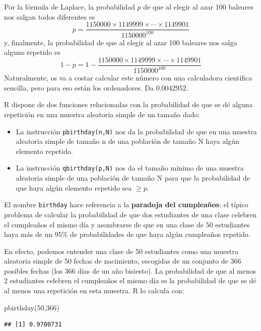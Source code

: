 \documentclass[
]{book}
\newenvironment{Shaded}{\begin{snugshade}}{\end{snugshade}}
\newcommand{\DecValTok}[1]{\textcolor[rgb]{0.00,0.00,0.81}{#1}}
\newcommand{\FunctionTok}[1]{\textcolor[rgb]{0.00,0.00,0.00}{#1}}
\newcommand{\NormalTok}[1]{#1}
\theoremstyle{definition}
\theoremstyle{definition}
\theoremstyle{definition}
\theoremstyle{definition}
\theoremstyle{remark}
\begin{document}
Por la fórmula de Laplace, la probabilidad \(p\) de que al elegir al azar 100 baleares nos salgan todos diferentes es
\[
p=\frac{1150000\times 1149999\times\cdots\times 1149901}{1150000^{100}}
\]
y, finalmente, la probabilidad de que al elegir al azar 100 baleares nos salga alguno repetido es
\[
1-p=1-\frac{1150000\times 1149999\times\cdots\times 1149901}{1150000^{100}}
\]
Naturalmente, os va a costar calcular este número con una calculadora científica sencilla, pero para eso están los ordenadores. Da 0.0042952.

R dispone de dos funciones relacionadas con la probabilidad de que se dé alguna repetición en una muestra aleatoria simple de un tamaño dado:

\begin{itemize}
\item
  La instrucción \texttt{pbirthday(n,N)} nos da la probabilidad de que en una muestra aleatoria simple de tamaño n de una población de tamaño N haya algún elemento repetido.
\item
  La instrucción \texttt{qbirthday(p,N)} nos da el tamaño mínimo de una muestra aleatoria simple de una población de tamaño N para que la probabilidad de que haya algún elemento repetido sea \(\geqslant p\).
\end{itemize}

El nombre \texttt{birthday} hace referencia a la \textbf{paradoja del cumpleaños}: el típico problema de calcular la probabilidad de que dos estudiantes de una clase celebren el cumpleaños el mismo día y asombrarse de que en una clase de 50 estudiantes haya más de un 95\% de probabilidades de que haya algún cumpleaños repetido.

En efecto, podemos entender una clase de 50 estudiantes como una muestra aleatoria simple de 50 fechas de nacimiento, escogidas de un conjunto de 366 posibles fechas (los 366 días de un año bisiesto). La probabilidad de que al menos 2 estudiantes celebren el cumpleaños el mismo día es la probabilidad de que se dé al menos una repetición en esta muestra. R lo calcula con:

\begin{Shaded}
\begin{Highlighting}[]
\FunctionTok{pbirthday}\NormalTok{(}\DecValTok{50}\NormalTok{,}\DecValTok{366}\NormalTok{)}
\end{Highlighting}
\end{Shaded}

\begin{verbatim}
## [1] 0.9700731
\end{verbatim}
\end{document}
